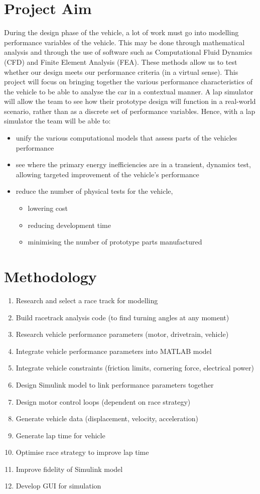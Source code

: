 \documentclass{article}
\begin{document}
\section{Project Aim}
During the design phase of the vehicle, a lot of work must go into modelling performance variables of the vehicle. This may be done through mathematical analysis and through the use of software such as Computational Fluid Dynamics (CFD) and Finite Element Analysis (FEA). These methods allow us to test whether our design meets our performance criteria (in a virtual sense). This project will focus on bringing together the various performance characteristics of the vehicle to be able to analyse the car in a contextual manner. A lap simulator will allow the team to see how their prototype design will function in a real-world scenario, rather than as a discrete set of performance variables. Hence, with a lap simulator the team will be able to:
\begin{itemize}
	\item unify the various computational models that assess parts of the vehicles performance
	\item see where the primary energy inefficiencies are in a transient, dynamics test, allowing targeted improvement of the vehicle's performance
	\item reduce the number of physical tests for the vehicle,
	      \begin{itemize}
		      \item lowering cost
		      \item reducing development time
		      \item minimising the number of prototype parts manufactured
	      \end{itemize}
\end{itemize}
\section{Methodology}
\begin{enumerate}
	\item Research and select a race track for modelling
	\item Build racetrack analysis code (to find turning angles at any moment)
	\item Research vehicle performance parameters (motor, drivetrain, vehicle)
	\item Integrate vehicle performance parameters into MATLAB model
	\item Integrate vehicle constraints (friction limits, cornering force, electrical power)
	\item Design Simulink model to link performance parameters together
	\item Design motor control loops (dependent on race strategy)
	\item Generate vehicle data (displacement, velocity, acceleration)
	\item Generate lap time for vehicle
	\item Optimise race strategy to improve lap time
	\item Improve fidelity of Simulink model
	\item Develop GUI for simulation
\end{enumerate}
\end{document}

